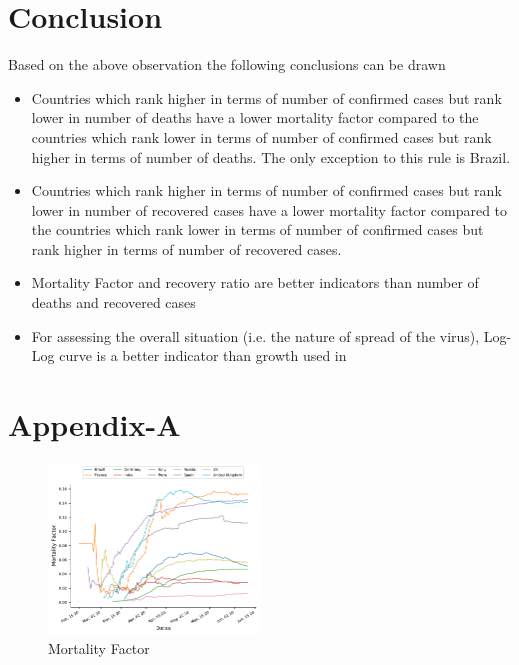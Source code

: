 \documentclass[12pt, twosided]{report}  %
\renewcommand\thesection{\arabic{section}} %
\renewcommand{\thefigure}{\thesection-\arabic{figure}} %
\begin{document}
\section{Conclusion}
Based on the above observation the following conclusions can be drawn
\begin{itemize}
	\item Countries which rank higher in terms of number of confirmed cases but rank lower in number of deaths have a lower mortality factor compared to the countries which rank lower in terms of number of confirmed cases but rank higher in terms of number of deaths. The only exception to this rule is Brazil.
	\item Countries which rank higher in terms of number of confirmed cases but rank lower in number of recovered cases have a lower mortality factor compared to the countries which rank lower in terms of number of confirmed cases but rank higher in terms of number of recovered cases.
	\item Mortality Factor and recovery ratio are better indicators than number of deaths and recovered cases
	\item For assessing the overall situation (i.e. the nature of spread of the virus), Log-Log curve is a better indicator than growth used in \cite{divyansh_covid_1}
\end{itemize}
 






\renewcommand{\thesection}{\Alph{section}}
\renewcommand{\thefigure}{\thesection-\arabic{figure}}
\setcounter{figure}{0}

\pagebreak
\appendix

\section{Appendix-A}

\begin{figure}[H]
	\centering
	\includegraphics[width=0.5\textwidth]{./images/plot_8.pdf}
	\caption{Mortality Factor}
	\label{plot_1}
\end{figure}
\end{document}
